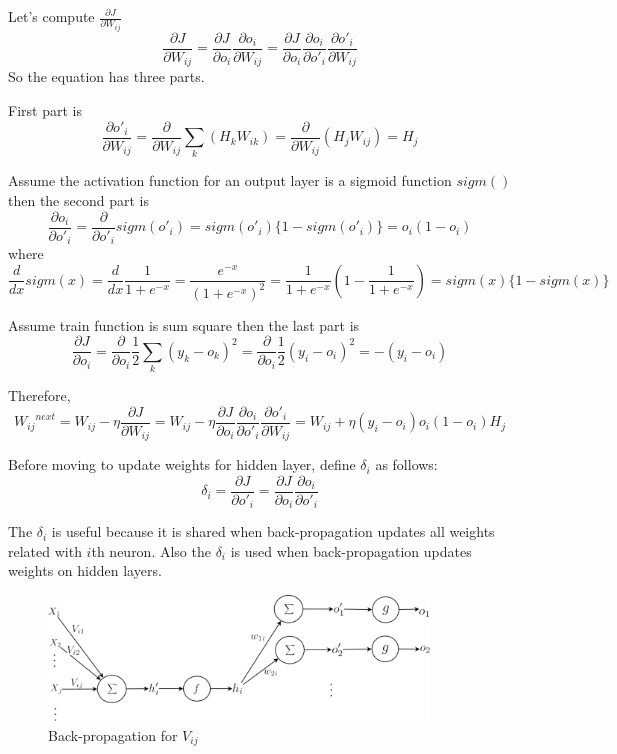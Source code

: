 \documentclass[draft,dvipsnames]{drexel-thesis}
\begin{document}
\begin{thesis}
Let's compute $\frac{\partial J}{\partial W_{ij}}$
$$
\frac{\partial J}{\partial W_{ij}}
= \frac{\partial J}{\partial o_i}\frac{\partial o_i}{\partial W_{ij}}
= \frac{\partial J}{\partial o_i}\frac{\partial o_i}{\partial o'_i}\frac{\partial o'_i}{\partial W_{ij}}
$$
So the equation has three parts.

First part is
$$
\frac{\partial o'_i}{\partial W_{ij}}
= \frac{\partial}{\partial W_{ij}}\sum_k(H_kW_{ik})
= \frac{\partial}{\partial W_{ij}}(H_jW_{ij})
= H_j
$$

Assume the activation function for an output layer is a sigmoid function $sigm()$ then the second part is
$$
\frac{\partial o_i}{\partial o'_i}
= \frac{\partial}{\partial o'_i}sigm(o'_i)
= sigm(o'_i)\{1-sigm(o'_i)\}
= o_i(1-o_i)
$$
where
$$\frac{d}{dx} sigm(x) = \frac{d}{dx} \frac{1}{1+e^{-x}} = \frac{e^{-x}}{(1+e^{-x})^2} = \frac{1}{1+e^{-x}}(1-\frac{1}{1+e^{-x}}) = sigm(x)\{1-sigm(x)\}$$

Assume train function is sum square then the last part is
$$
\frac{\partial J}{\partial o_i}
= \frac{\partial}{\partial o_i}\frac{1}{2}\sum_k(y_k-o_k)^2
= \frac{\partial}{\partial o_i}\frac{1}{2}(y_i-o_i)^2
= -(y_i-o_i)
$$

Therefore,
$$
{{W_{ij}}^{next}}
= W_{ij} - \eta\frac{\partial J}{\partial W_{ij}}
= W_{ij} - \eta\frac{\partial J}{\partial o_i}\frac{\partial o_i}{\partial o'_i}\frac{\partial o'_i}{\partial W_{ij}}
= W_{ij} + \eta(y_i-o_i)o_i(1-o_i)H_j
$$

Before moving to update weights for hidden layer, define $\delta_i$ as follows:
$$
\delta_i
= \frac{\partial J}{\partial o'_i}
= \frac{\partial J}{\partial o_i}\frac{\partial o_i}{\partial o'_i}
$$

The $\delta_i$ is useful because it is shared when back-propagation updates all weights related with $i$th neuron. Also the $\delta_i$ is used when back-propagation updates weights on hidden layers.

\begin{figure}[t!]
    \centering
    \includegraphics[width=0.9\textwidth]{pictures/figures/BP2.png}
    \caption{Back-propagation for $V_{ij}$}
    \label{fig:BP2}
\end{figure}


\end{thesis}
\end{document}
